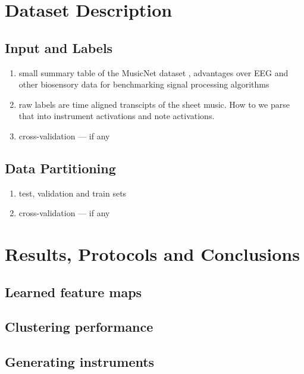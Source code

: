 \documentclass{article}[12pt]
\numberwithin{equation}{section}
\begin{document}
\section{Dataset Description}

\subsection{Input and Labels}
\begin{enumerate}
	\item small summary table of the MusicNet dataset \cite{Thickstun2016}, advantages
	over EEG and other biosensory data for benchmarking signal processing algorithms
	\item raw labels are time aligned transcipts of the sheet music. How to we
	parse that into instrument activations and note activations.
	\item cross-validation --- if any
\end{enumerate}

\subsection{Data Partitioning}
\begin{enumerate}
	\item test, validation and train sets
	\item cross-validation --- if any
\end{enumerate}

\section{Results, Protocols and Conclusions}
\subsection{Learned feature maps}

\subsection{Clustering performance}

\subsection{Generating instruments}



\end{document}
